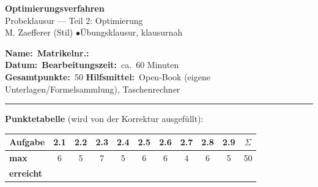 \documentclass[a4paper,11pt]{article}
\begin{document}
\begin{center}
  {\LARGE\color{accent}\textbf{Optimierungsverfahren}}\\[3pt]
  {\large Probeklausur --- Teil 2: Optimierung}\\[2pt]
  {\small M. Zaefferer (Stil) \quad$\bullet$\quad Übungsklausur, klausurnah}
\end{center}
\vspace{2mm}
\noindent\textbf{Name:}\ \underline{\hspace{6cm}}\hfill\textbf{Matrikelnr.:}\ \underline{\hspace{4cm}}\\[4pt]
\noindent\textbf{Datum:}\ \underline{\hspace{4cm}}\hfill\textbf{Bearbeitungszeit:}\ ca.\ 60 Minuten\\[4pt]
\noindent\textbf{Gesamtpunkte:}\ 50 \hfill \textbf{Hilfsmittel:}\ Open-Book (eigene Unterlagen/Formelsammlung), Taschenrechner\\[4pt]
{\color{gridcol}\rule{\linewidth}{0.4pt}}
\vspace{2mm}

\noindent\textbf{Punktetabelle} (wird von der Korrektur ausgefüllt):
\par\vspace{1mm}
\renewcommand{\arraystretch}{1.5}
\noindent\begin{tabular}{|>{\centering\arraybackslash}m{1.6cm}|c|c|c|c|c|c|c|c|c||c|}
\hline
\textbf{Aufgabe} & 2.1 & 2.2 & 2.3 & 2.4 & 2.5 & 2.6 & 2.7 & 2.8 & 2.9 & $\Sigma$ \\\hline
\textbf{max} & 6 & 5 & 7 & 5 & 6 & 6 & 4 & 6 & 5 & 50 \\\hline
\textbf{erreicht} & & & & & & & & & & \\\hline
\end{tabular}
\renewcommand{\arraystretch}{1}
\par\vspace{3mm}
\end{document}
